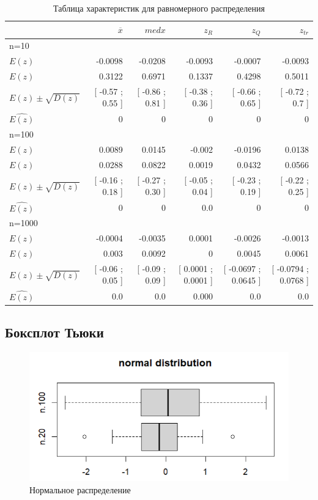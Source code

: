 \documentclass[a4paper,14pt]{article}
\begin{document}
	\begin{table}[H]
		\centering
		\begin{tabular}[t]{|l|r|r|r|r|r|}
			\hline
			& $\overline{x}$ & $med x$ & $z_R$ & $z_Q$ & $z_{tr}$\\\hline\hline
			n=10 & & & & &\\\hline
			$E(z)$  & -0.0098 & -0.0208 & -0.0093 & -0.0007 & -0.0093  \\\hline
$E(z)$  & 0.3122 & 0.6971 & 0.1337 & 0.4298 & 0.5011  \\\hline
$E(z)\pm\sqrt{D(z)}$  & [ -0.57 ; 0.55 ] & [ -0.86 ; 0.81 ] & [ -0.38 ; 0.36 ] & [ -0.66 ; 0.65 ] & [ -0.72 ; 0.7 ]  \\\hline
			$\hat{E(z)}$ & 0 & 0 & 0 & 0 & 0\\\hline
			
			n=100 & & & & &\\\hline
			$E(z)$  & 0.0089 & 0.0145 & -0.002 & -0.0196 & 0.0138  \\\hline
$E(z)$  & 0.0288 & 0.0822 & 0.0019 & 0.0432 & 0.0566  \\\hline
$E(z)\pm\sqrt{D(z)}$  & [ -0.16 ; 0.18 ] & [ -0.27 ; 0.30 ] & [ -0.05 ; 0.04 ] & [ -0.23 ; 0.19 ] & [ -0.22 ; 0.25 ]  \\\hline
			$\hat{E(z)}$ & 0 & 0 & 0.0 & 0 & 0\\\hline
			
			n=1000 & & & & &\\\hline
			$E(z)$  & -0.0004 & -0.0035 & 0.0001 & -0.0026 & -0.0013  \\\hline
$E(z)$  & 0.003 & 0.0092 & 0 & 0.0045 & 0.0061  \\\hline
$E(z)\pm\sqrt{D(z)}$  & [ -0.06 ; 0.05 ] & [ -0.09 ; 0.09 ] & [ 0.0001 ; 0.0001 ] & [ -0.0697 ; 0.0645 ] & [ -0.0794 ; 0.0768 ]  \\\hline
			$\hat{E(z)}$ & 0.0 & 0.0 & 0.000 & 0.0 & 0.0\\\hline
			
		\end{tabular}
		\caption{Таблица характеристик для равномерного распределения}
		\label{tab:uniform}
	\end{table}
	\subsection{Боксплот Тьюки}
	\begin{figure}[H]
		\centering
		\includegraphics[scale=0.9]{./lab1_3/pictures/boxplot rnorm.PNG}
		\caption{Нормальное распределение}
		\label{fig:normal}
	\end{figure}
	
\end{document}
